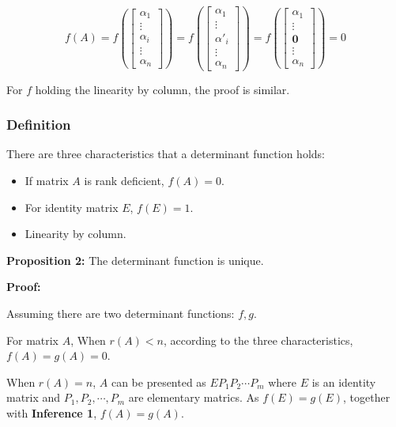 \documentclass{article}
\begin{document}
\begin{equation}
f(A)=f(
\begin{bmatrix}
    \alpha_1 \\
    \vdots \\
    \alpha_i \\
    \vdots \\
    \alpha_n
\end{bmatrix})=
f(\begin{bmatrix}
    \alpha_1 \\
    \vdots \\
    \alpha'_i \\
    \vdots \\
    \alpha_n
\end{bmatrix})=
f(\begin{bmatrix}
    \alpha_1 \\
    \vdots \\
    \mathbf{0} \\
    \vdots \\
    \alpha_n
\end{bmatrix})=0
\end{equation}

For \(f\) holding the linearity by column, the proof is similar.

\subsubsection{Definition}

There are three characteristics that a determinant function holds:

\begin{itemize}
    \item If matrix \(A\) is rank deficient, \(f(A)=0\).
    \item For identity matrix \(E\), \(f(E)=1\).
    \item Linearity by column.
\end{itemize}

\vspace{2mm}
\textbf{Proposition 2:} The determinant function is unique.

\vspace{2mm}
\textbf{Proof:}

Assuming there are two determinant functions: \(f, g\). 

For matrix \(A\), When \(r(A)<n\), according to the three characteristics,
\(f(A)=g(A)=0\).

When \(r(A)=n\), \(A\) can be presented as \(EP_1P_2\cdots P_m\) where
\(E\) is an identity matrix and \(P_1, P_2, \cdots, P_m\) are elementary
matrics. As \(f(E)=g(E)\), together with \textbf{Inference 1}, 
\(f(A)=g(A)\).
\end{document}
